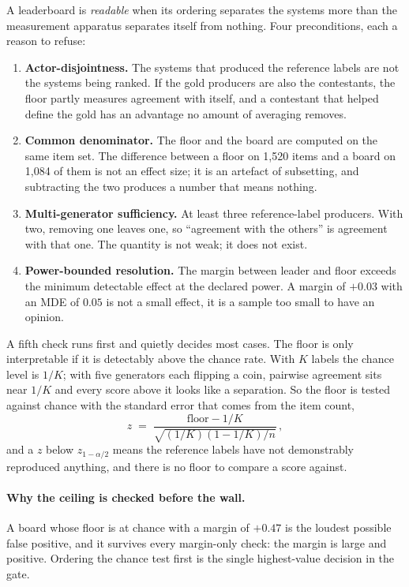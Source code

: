 \documentclass[11pt]{article}
\begin{document}
A leaderboard is \emph{readable} when its ordering separates the systems more
than the measurement apparatus separates itself from nothing. Four
preconditions, each a reason to refuse:

\begin{enumerate}
\item \textbf{Actor-disjointness.} The systems that produced the reference
labels are not the systems being ranked. If the gold producers are also the
contestants, the floor partly measures agreement with itself, and a contestant
that helped define the gold has an advantage no amount of averaging removes.
\item \textbf{Common denominator.} The floor and the board are computed on the
same item set. The difference between a floor on 1,520 items and a board on
1,084 of them is not an effect size; it is an artefact of subsetting, and
subtracting the two produces a number that means nothing.
\item \textbf{Multi-generator sufficiency.} At least three reference-label
producers. With two, removing one leaves one, so ``agreement with the
others'' is agreement with that one. The quantity is not weak; it does not
exist.
\item \textbf{Power-bounded resolution.} The margin between leader and floor
exceeds the minimum detectable effect at the declared power. A margin of
$+0.03$ with an MDE of $0.05$ is not a small effect, it is a sample too small
to have an opinion.
\end{enumerate}

A fifth check runs first and quietly decides most cases. The floor is only
interpretable if it is detectably above the chance rate. With $K$ labels the
chance level is $1/K$; with five generators each flipping a coin, pairwise
agreement sits near $1/K$ and every score above it looks like a separation. So
the floor is tested against chance with the standard error that comes from the
item count,
\[
z \;=\; \frac{\text{floor} - 1/K}{\sqrt{(1/K)(1-1/K)/n}}\,,
\]
and a $z$ below $z_{1-\alpha/2}$ means the reference labels have not
demonstrably reproduced anything, and there is no floor to compare a score
against.

\paragraph{Why the ceiling is checked before the wall.} A board whose floor is
at chance with a margin of $+0.47$ is the loudest possible false positive, and
it survives every margin-only check: the margin is large and positive. Ordering
the chance test first is the single highest-value decision in the gate.
\end{document}
